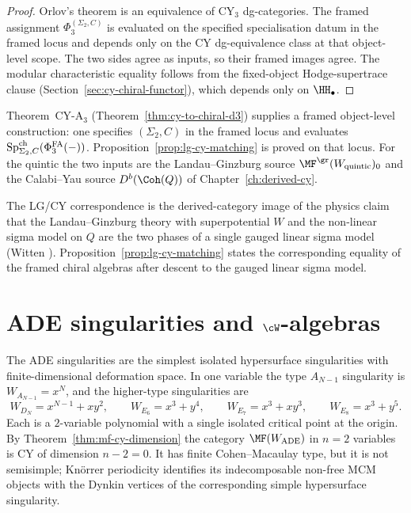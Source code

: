 \begin{proof}
Orlov's theorem is an equivalence of CY$_3$ dg-categories. The framed assignment $\Phi_3^{(\Sigma_2,C)}$ is evaluated on the specified specialisation datum in the framed locus and depends only on the CY dg-equivalence class at that object-level scope. The two sides agree as inputs, so their framed images agree. The modular characteristic equality follows from the fixed-object Hodge-supertrace clause (Section~\ref{sec:cy-chiral-functor}), which depends only on $\HH_\bullet$.
\end{proof}

\begin{remark}[Framed \texorpdfstring{$d = 3$}{d = 3} construction]
\label{rem:mf-d3-conditional}
Theorem~CY-A$_3$ (Theorem~\ref{thm:cy-to-chiral-d3}) supplies a framed object-level construction: one specifies $(\Sigma_2,C)$ in the framed locus and evaluates $\mathrm{Sp}^{\mathrm{ch}}_{\Sigma_2,C}(\Phi^{\mathrm{FA}}_3(-))$. Proposition~\ref{prop:lg-cy-matching} is proved on that locus. For the quintic the two inputs are the Landau--Ginzburg source $\MF^{\gr}(W_{\mathrm{quintic}})_0$ and the Calabi--Yau source $D^b(\Coh(Q))$ of Chapter~\ref{ch:derived-cy}.
\end{remark}

The LG/CY correspondence is the derived-category image of the physics claim that the Landau--Ginzburg theory with superpotential $W$ and the non-linear sigma model on $Q$ are the two phases of a single gauged linear sigma model (Witten \cite{Witten1993}). Proposition~\ref{prop:lg-cy-matching} states the corresponding equality of the framed chiral algebras after descent to the gauged linear sigma model.

\section{ADE singularities and \texorpdfstring{$\cW$}{W}-algebras}
\label{sec:ade-w-algebras}

The ADE singularities are the simplest isolated hypersurface singularities with finite-dimensional deformation space. In one variable the type $A_{N-1}$ singularity is $W_{A_{N-1}} = x^N$, and the higher-type singularities are
\[
 W_{D_N} = x^{N-1} + xy^2, \qquad
 W_{E_6} = x^3 + y^4, \qquad
 W_{E_7} = x^3 + xy^3, \qquad
 W_{E_8} = x^3 + y^5 .
\]
Each is a $2$-variable polynomial with a single isolated critical point at the origin. By Theorem~\ref{thm:mf-cy-dimension} the category $\MF(W_{\mathrm{ADE}})$ in $n = 2$ variables is CY of dimension $n - 2 = 0$. It has finite Cohen--Macaulay type, but it is not semisimple; Kn\"orrer periodicity \cite{Knorrer1987,BuchweitzGreuelSchreyer1987} identifies its indecomposable non-free MCM objects with the Dynkin vertices of the corresponding simple hypersurface singularity.


